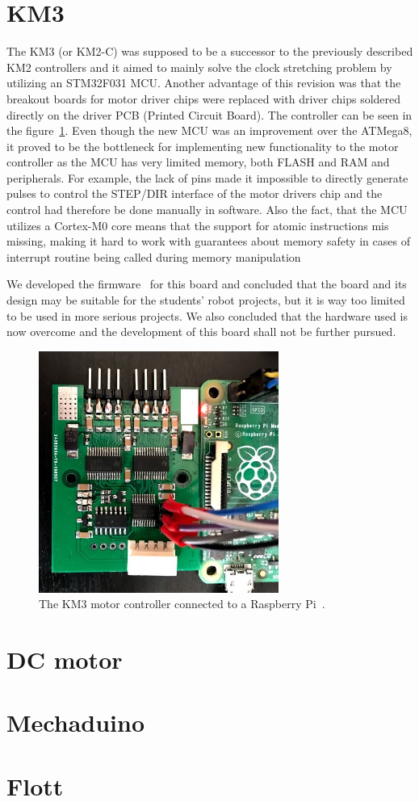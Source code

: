 \section{KM3}
\label{sec:km3}
The KM3 (or KM2-C) was supposed to be a successor to the previously described KM2 controllers and it aimed to mainly solve the clock stretching problem by utilizing an STM32F031 MCU.
Another advantage of this revision was that the breakout boards for motor driver chips were replaced with driver chips soldered directly on the driver PCB (Printed Circuit Board).
The controller can be seen in the figure~\ref{fig:km3}.
Even though the new MCU was an improvement over the ATMega8, it proved to be the bottleneck for implementing new functionality to the motor controller as the MCU has very limited memory, both FLASH and RAM and peripherals.
For example, the lack of pins made it impossible to directly generate pulses to control the STEP/DIR interface of the motor drivers chip and the control had therefore be done manually in software.
Also the fact, that the MCU utilizes a Cortex-M0 core means that the support for atomic instructions mis missing, making it hard to work with guarantees about memory safety in cases of interrupt routine being called during memory manipulation

We developed the firmware~\cite{km3-firmware} for this board and concluded that the board and its design may be suitable for the students' robot projects, but it is way too limited to be used in more serious projects.
We also concluded that the hardware used is now overcome and the development of this board shall not be further pursued.

\begin{figure}[H]
    \centering
    \includegraphics[width=0.7\textwidth]{obrazky/km3}
    \caption{The KM3 motor controller connected to a Raspberry Pi~\cite{km2render}.}
    \label{fig:km3}
\end{figure}

\section{DC motor}
\label{sec:dcmotor}

\section{Mechaduino}
\label{sec:mechaduino}

\section{Flott}
\label{sec:flott}
